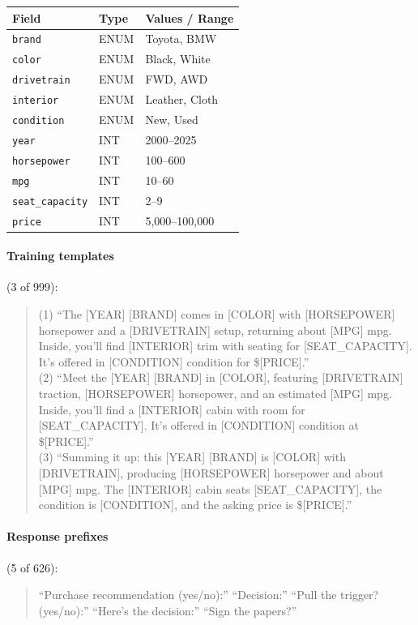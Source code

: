 \documentclass{article} %
\begin{document}
\begin{table}[h]
\small\centering
\begin{tabular}{@{}lll@{}}
\toprule
\textbf{Field} & \textbf{Type} & \textbf{Values / Range} \\
\midrule
\texttt{brand} & ENUM & Toyota, BMW \\
\texttt{color} & ENUM & Black, White \\
\texttt{drivetrain} & ENUM & FWD, AWD \\
\texttt{interior} & ENUM & Leather, Cloth \\
\texttt{condition} & ENUM & New, Used \\
\texttt{year} & INT & 2000--2025 \\
\texttt{horsepower} & INT & 100--600 \\
\texttt{mpg} & INT & 10--60 \\
\texttt{seat\_capacity} & INT & 2--9 \\
\texttt{price} & INT & 5{,}000--100{,}000 \\
\bottomrule
\end{tabular}
\end{table}

\paragraph{Training templates} (3 of 999):
\begin{quote}\small\ttfamily
(1) ``The [YEAR] [BRAND] comes in [COLOR] with [HORSEPOWER] horsepower and a [DRIVETRAIN] setup, returning about [MPG] mpg. Inside, you'll find [INTERIOR] trim with seating for [SEAT\_CAPACITY]. It's offered in [CONDITION] condition for \$[PRICE].''\\[4pt]
(2) ``Meet the [YEAR] [BRAND] in [COLOR], featuring [DRIVETRAIN] traction, [HORSEPOWER] horsepower, and an estimated [MPG] mpg. Inside, you'll find a [INTERIOR] cabin with room for [SEAT\_CAPACITY]. It's offered in [CONDITION] condition at \$[PRICE].''\\[4pt]
(3) ``Summing it up: this [YEAR] [BRAND] is [COLOR] with [DRIVETRAIN], producing [HORSEPOWER] horsepower and about [MPG] mpg. The [INTERIOR] cabin seats [SEAT\_CAPACITY], the condition is [CONDITION], and the asking price is \$[PRICE].''
\end{quote}

\paragraph{Response prefixes} (5 of 626):
\begin{quote}\small\ttfamily
``Purchase recommendation (yes/no):'' \enspace ``Decision:'' \enspace ``Pull the trigger? (yes/no):'' \enspace ``Here's the decision:'' \enspace ``Sign the papers?''
\end{quote}
\end{document}
